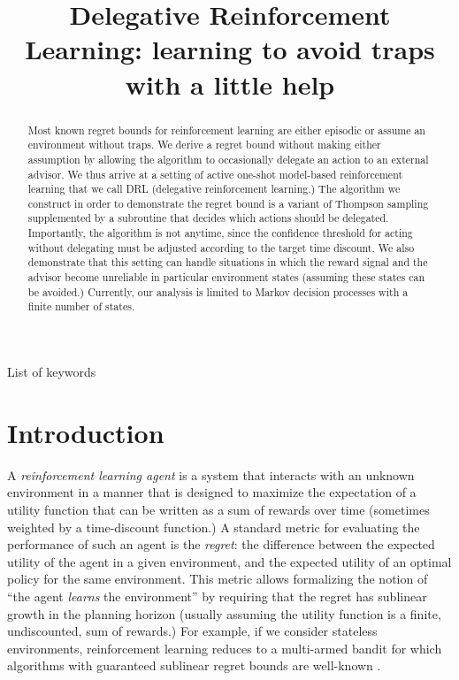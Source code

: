\documentclass[anon,12pt]{colt2018} %
\title[Delegative Reinforcement Learning]{Delegative Reinforcement Learning: learning to avoid traps\\ with a little help}
\begin{document}
\maketitle

\begin{abstract}
Most known regret bounds for reinforcement learning are either episodic or assume an environment without traps. We derive a regret bound without making either assumption by allowing the algorithm to occasionally delegate an action to an external advisor. We thus arrive at a setting of active one-shot model-based reinforcement learning that we call DRL (delegative reinforcement learning.) The algorithm we construct in order to demonstrate the regret bound is a variant of Thompson sampling supplemented by a subroutine that decides which actions should be delegated. Importantly, the algorithm is not anytime, since the confidence threshold for acting without delegating must be adjusted according to the target time discount. We also demonstrate that this setting can handle situations in which the reward signal and the advisor become unreliable in particular environment states (assuming these states can be avoided.) Currently, our analysis is limited to Markov decision processes with a finite number of states.
\end{abstract}

\begin{keywords}
List of keywords
\end{keywords}

\section{Introduction}

A \emph{reinforcement learning agent} is a system that interacts with an unknown environment in a manner that is designed to maximize the expectation of a utility function that can be written as a sum of rewards over time (sometimes weighted by a time-discount function.) A standard metric for evaluating the performance of such an agent is the \emph{regret}: the difference between the expected utility of the agent in a given environment, and the expected utility of an optimal policy for the same environment. This metric allows formalizing the notion of \enquote{the agent \emph{learns} the environment} by requiring that the regret has sublinear growth in the planning horizon (usually assuming the utility function is a finite, undiscounted, sum of rewards.) For example, if we consider stateless environments, reinforcement learning reduces to a multi-armed bandit for which algorithms with guaranteed sublinear regret bounds are well-known \cite{TBD}.
\end{document}
